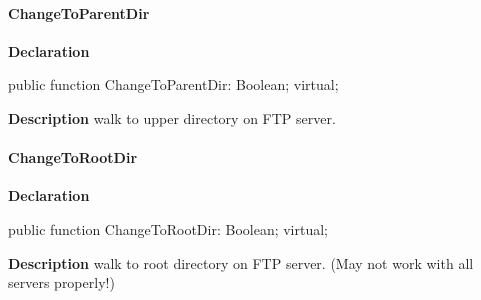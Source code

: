 \documentclass{report}
\newif\ifpdf
\begin{document}
\paragraph*{ChangeToParentDir}\hspace*{\fill}

\label{ftpsend.TFTPSend-ChangeToParentDir}
\begin{list}{}{
\setlength{\itemindent}{0cm}
\setlength{\listparindent}{0cm}
\setlength{\leftmargin}{\evensidemargin}
\addtolength{\leftmargin}{\tmplength}
\settowidth{\labelsep}{X}
\addtolength{\leftmargin}{\labelsep}
\setlength{\labelwidth}{\tmplength}
}
\item[\textbf{Declaration}\hfill]
\ifpdf
\begin{flushleft}
\fi
\begin{ttfamily}
public function ChangeToParentDir: Boolean; virtual;\end{ttfamily}

\ifpdf
\end{flushleft}
\fi

\par
\item[\textbf{Description}]
walk to upper directory on FTP server.

\end{list}
\paragraph*{ChangeToRootDir}\hspace*{\fill}

\label{ftpsend.TFTPSend-ChangeToRootDir}
\begin{list}{}{
\setlength{\itemindent}{0cm}
\setlength{\listparindent}{0cm}
\setlength{\leftmargin}{\evensidemargin}
\addtolength{\leftmargin}{\tmplength}
\settowidth{\labelsep}{X}
\addtolength{\leftmargin}{\labelsep}
\setlength{\labelwidth}{\tmplength}
}
\item[\textbf{Declaration}\hfill]
\ifpdf
\begin{flushleft}
\fi
\begin{ttfamily}
public function ChangeToRootDir: Boolean; virtual;\end{ttfamily}

\ifpdf
\end{flushleft}
\fi

\par
\item[\textbf{Description}]
walk to root directory on FTP server. (May not work with all servers properly!)

\end{list}
\end{document}
